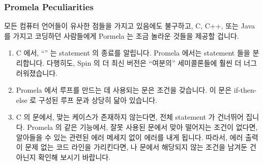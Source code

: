 \subsubsection{Promela Peculiarities}
\label{sec:formal:Promela Peculiarities}

모든 컴퓨터 언어들이 유사한 점들을 가지고 있음에도 불구하고, C, C++, 또는 Java
를 가지고 코딩하던 사람들에게 Pormela 는 조금 놀라운 것들을 제공할 겁니다.
\iffalse

Although all computer languages have underlying similarities,
Promela will provide some surprises to people used to coding in C,
C++, or Java.
\fi

\begin{enumerate}
\item	C 에서, ``\co{;}'' 는 statement 의 종료를 알립니다.
	Promela 에서는 statement 들을 분리합니다.
	다행히도, Spin 의 더 최신 버전은 ``여분의'' 세미콜론들에 훨씬 더
	너그러워졌습니다.
\item	Promela 에서 루프를 만드는 데 사용되는  문은 조건을 갖습니다.
	이  문은 if-then-else 로 구성된 루프 문과 상당히 닮아 있습니다.
\item	C 의  문에서, 맞는 케이스가 존재하지 않는다면, 전체
	statement 가 건너뛰어 집니다.
	Promela 의 같은 기능에서, 잘못 사용된  문에서 맞아 떨어지는
	조건이 없다면, 알아들을 수 있는 관련된 에러 메세지 없이 에러를 내게
	됩니다.
	따라서, 에러 출력이 문제 없는 코드 라인을 가리킨다면,  나
	 문에서 해당되지 않는 조건을 남겨둔 건 아닌지 확인해 보시기
	바랍니다.
\iffalse


\end{enumerate}
